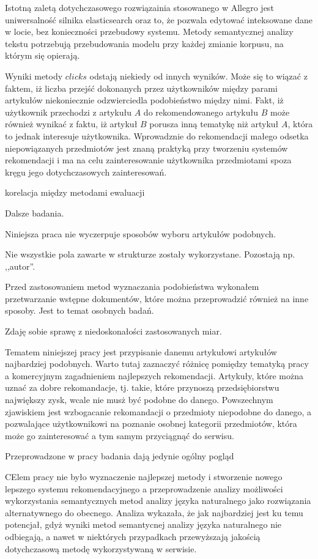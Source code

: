 \documentclass[pl]{minipw} %
\begin{document}
Istotną zaletą dotychczasowego rozwiązainia stosowanego w Allegro jest uniwersalność silnika elasticsearch oraz to, że pozwala edytować inteksowane dane w locie, bez konieczności przebudowy systemu. Metody semantycznej analizy tekstu potrzebują przebudowania modelu przy każdej zmianie korpusu, na którym się opierają. 

Wyniki metody $clicks$ odstają niekiedy od innych wyników. Może się to wiązać z faktem, iż liczba przejść dokonanych przez użytkowników między parami artykułów niekoniecznie odzwierciedla podobieństwo między nimi. Fakt, iż użytkownik przechodzi z artykułu $A$ do rekomendowanego artykułu $B$ może również wynikać z faktu, iż artykuł $B$ porusza inną tematykę niż artykuł $A$, która to jednak interesuje użytkownika. Wprowadznie do rekomendacji małego odsetka niepowiązanych przedmiotów jest znaną praktyką przy tworzeniu systemów rekomendacji i ma na celu zainteresowanie użytkownika przedmiotami spoza kręgu jego dotychczasowych zainteresowań.

korelacja między metodami ewaluacji

Dalsze badania.

Niniejsza praca nie wyczerpuje sposobów wyboru artykułów podobnych. 

Nie wszystkie pola zawarte w strukturze zostały wykorzystane. Pozostają np. ,,autor''.

Przed zastosowaniem metod wyznaczania podobieństwa wykonałem przetwarzanie wstępne dokumentów, które można przeprowadzić również na inne sposoby. Jest to temat osobnych badań.

Zdaję sobie sprawę z niedoskonałości zastosowanych miar.

Tematem niniejszej pracy jest przypisanie danemu artykułowi artykułów najbardziej podobnych. Warto tutaj zaznaczyć różnicę pomiędzy tematyką pracy a komercyjnym zagadnieniem najlepszych rekomendacji. Artykuły, które można uznać za dobre rekomandacje, tj. takie, które przynoszą przedsiębiorstwu największy zysk, wcale nie musż być podobne do danego. Powszechnym zjawiskiem jest wzbogacanie rekomandacji o przedmioty niepodobne do danego, a pozwalające użytkownikowi na poznanie osobnej kategorii przedmiotów, która może go zainteresować a tym samym przyciągnąć do serwisu.

Przeprowadzone w pracy badania dają jedynie ogólny pogląd

CElem pracy nie było wyznaczenie najlepszej metody i stworzenie nowego lepszego systemu rekomendacyjnego a przeprowadzenie analizy możliwości wykorzystania semantycznych metod analizy języka naturalnego jako rozwiązania alternatywnego do obecnego. Analiza wykazała, że jak najbardziej jest ku temu potencjał, gdyż wyniki metod semantycnej analizy języka naturalnego nie odbiegają, a nawet w niektórych przypadkach przewyższają jakością dotychczasową metodę wykorzystywaną w serwisie.
\end{document}
